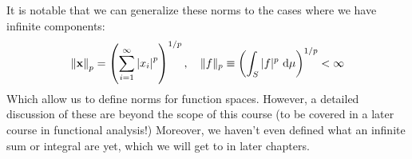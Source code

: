 It is notable that we can generalize these norms to the cases where we have infinite components:
\begin{align*}
    \norm{\mathbf{x}}_p = \left(\sum_{i = 1}^\infty \abs{x_i}^p\right)^{1/p}, \quad 
    \|f\|_{p} \equiv\left(\int_{S}|f|^{p} \mathrm{~d} \mu\right)^{1 / p}<\infty
\end{align*}
Which allow us to define norms for function spaces. However, a detailed discussion of these are beyond the scope of this course (to be covered in a later course in functional analysis!) Moreover, we haven't even defined what an infinite sum or integral are yet, which we will get to in later chapters. 